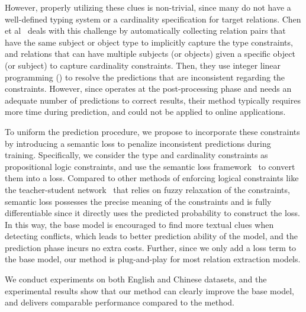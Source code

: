 However, properly utilizing these clues is non-trivial, since many \KBs do not have a well-defined typing system or a cardinality specification for target relations.
Chen et al~ deals with this challenge by automatically collecting relation pairs that have the same subject or object type to implicitly capture the type constraints, and relations that can have multiple subjects (or objects) given a specific object (or subject) to capture cardinality constraints.
Then, they use  integer linear programming (\ILP) to resolve the predictions that are inconsistent regarding the constraints.
However, since \ILP operates at the post-processing phase and needs an adequate number of predictions to correct results, their method typically requires more time during prediction, 
and could not be applied to online applications.

To uniform the prediction procedure,
we propose to incorporate these constraints by introducing a semantic loss to penalize inconsistent predictions during training.
Specifically, we consider the type and cardinality constraints as propositional logic constraints, and use the semantic loss framework~\cite{xu2017semantic} to convert them into a loss.
Compared to other methods of enforcing logical constraints like the teacher-student network~\cite{hu2016harnessing} that relies on fuzzy relaxation of the constraints, semantic loss possesses the precise meaning of the constraints and is fully differentiable since it directly uses the predicted probability to construct the loss.
In this way, the base model is encouraged to find more textual clues when detecting conflicts, which leads to better prediction ability of the model, and the prediction phase incurs no extra costs.
Further, since we only add a loss term to the base model, our method is plug-and-play for most relation extraction models.

We conduct experiments on both English and Chinese datasets,
and the experimental results show that our method can clearly improve the base model, and delivers comparable performance compared to the \ILP method.


